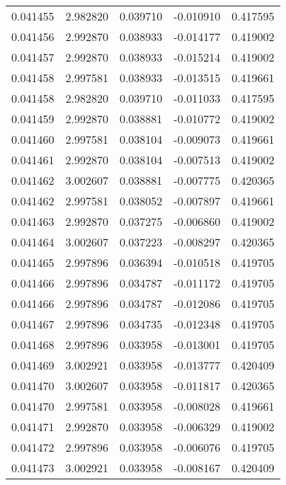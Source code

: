 \begin{tabular}{lrrrr}
0.041455    &  2.982820 &  0.039710 & -0.010910 &             0.417595 \\
0.041456    &  2.992870 &  0.038933 & -0.014177 &             0.419002 \\
0.041457    &  2.992870 &  0.038933 & -0.015214 &             0.419002 \\
0.041458    &  2.997581 &  0.038933 & -0.013515 &             0.419661 \\
0.041458    &  2.982820 &  0.039710 & -0.011033 &             0.417595 \\
0.041459    &  2.992870 &  0.038881 & -0.010772 &             0.419002 \\
0.041460    &  2.997581 &  0.038104 & -0.009073 &             0.419661 \\
0.041461    &  2.992870 &  0.038104 & -0.007513 &             0.419002 \\
0.041462    &  3.002607 &  0.038881 & -0.007775 &             0.420365 \\
0.041462    &  2.997581 &  0.038052 & -0.007897 &             0.419661 \\
0.041463    &  2.992870 &  0.037275 & -0.006860 &             0.419002 \\
0.041464    &  3.002607 &  0.037223 & -0.008297 &             0.420365 \\
0.041465    &  2.997896 &  0.036394 & -0.010518 &             0.419705 \\
0.041466    &  2.997896 &  0.034787 & -0.011172 &             0.419705 \\
0.041466    &  2.997896 &  0.034787 & -0.012086 &             0.419705 \\
0.041467    &  2.997896 &  0.034735 & -0.012348 &             0.419705 \\
0.041468    &  2.997896 &  0.033958 & -0.013001 &             0.419705 \\
0.041469    &  3.002921 &  0.033958 & -0.013777 &             0.420409 \\
0.041470    &  3.002607 &  0.033958 & -0.011817 &             0.420365 \\
0.041470    &  2.997581 &  0.033958 & -0.008028 &             0.419661 \\
0.041471    &  2.992870 &  0.033958 & -0.006329 &             0.419002 \\
0.041472    &  2.997896 &  0.033958 & -0.006076 &             0.419705 \\
0.041473    &  3.002921 &  0.033958 & -0.008167 &             0.420409 \\

\end{tabular}
